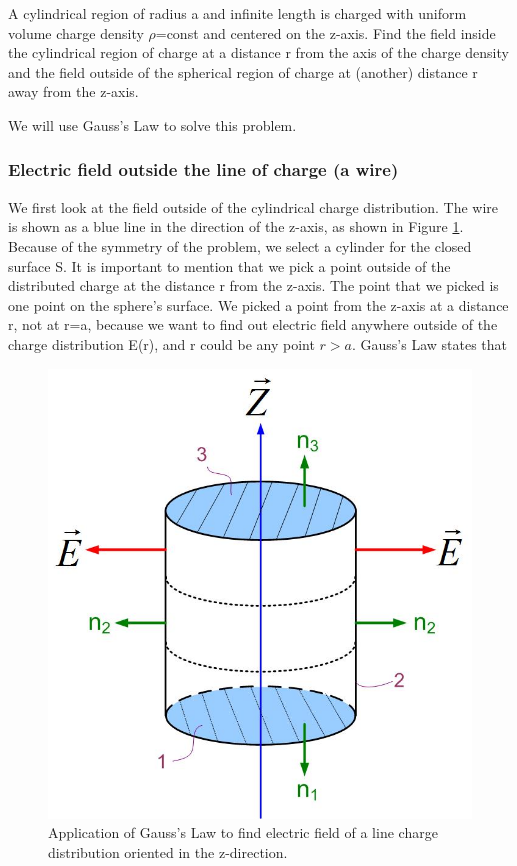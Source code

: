 \documentclass{ximera}
\begin{document}
A cylindrical region of radius a and infinite length is charged with uniform volume charge density $\rho$=const and centered on the z-axis. Find the field inside the cylindrical region of charge at a distance r from the axis of the charge density and the field outside of the spherical region of charge at (another) distance r away from the z-axis.

We will use Gauss's Law to solve this problem.



\subsubsection{Electric field outside the line of charge (a wire)}



 We first look at the field outside of the cylindrical charge distribution. The wire is shown as a blue line in the direction of the z-axis, as shown in Figure \ref{fig:gaussLineOut}.  Because of the symmetry of the problem, we select a cylinder for the closed surface S. It is important to mention that we pick a point outside of the distributed charge at the distance r from the z-axis. The point that we picked is one point on the sphere's surface. We picked a point from the z-axis at a distance r, not at r=a, because we want to find out electric field anywhere outside of the charge distribution E(r), and r could be any point $r>a$. Gauss's Law states that 



\begin{figure}[htbp]
\begin{center}
\includegraphics[scale=0.5]{../jpg/gausslawcylinder.jpg}
\end{center}
\caption{Application of Gauss's Law to find electric field of a line charge distribution oriented in the z-direction.}
\label{fig:gaussLineOut}
\end{figure}
\end{document}
